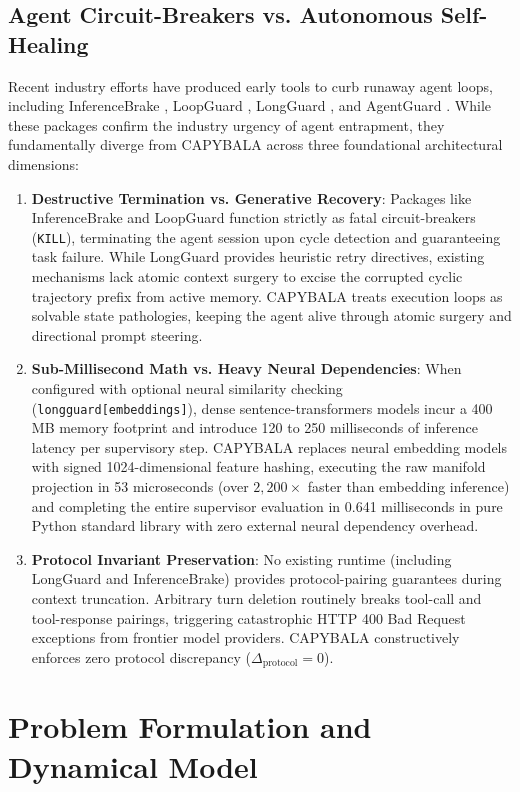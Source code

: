 \documentclass[journal]{IEEEtran}
\begin{document}
\subsection{Agent Circuit-Breakers vs. Autonomous Self-Healing}
Recent industry efforts have produced early tools to curb runaway agent loops, including InferenceBrake \cite{inferencebrake2024}, LoopGuard \cite{loopguard2024}, LongGuard \cite{longguard2024}, and AgentGuard \cite{agentguard2024}. While these packages confirm the industry urgency of agent entrapment, they fundamentally diverge from CAPYBALA across three foundational architectural dimensions:
\begin{enumerate}[leftmargin=12pt, topsep=2pt, itemsep=1pt]
    \item \textbf{Destructive Termination vs. Generative Recovery}: Packages like InferenceBrake and LoopGuard function strictly as fatal circuit-breakers (\texttt{KILL}), terminating the agent session upon cycle detection and guaranteeing task failure. While LongGuard provides heuristic retry directives, existing mechanisms lack atomic context surgery to excise the corrupted cyclic trajectory prefix from active memory. CAPYBALA treats execution loops as solvable state pathologies, keeping the agent alive through atomic surgery and directional prompt steering.
    \item \textbf{Sub-Millisecond Math vs. Heavy Neural Dependencies}: When configured with optional neural similarity checking (\texttt{longguard[embeddings]}), dense sentence-transformers models incur a 400 MB memory footprint and introduce 120 to 250 milliseconds of inference latency per supervisory step. CAPYBALA replaces neural embedding models with signed 1024-dimensional feature hashing, executing the raw manifold projection in 53 microseconds (over $2,200\times$ faster than embedding inference) and completing the entire supervisor evaluation in 0.641 milliseconds in pure Python standard library with zero external neural dependency overhead.
    \item \textbf{Protocol Invariant Preservation}: No existing runtime (including LongGuard and InferenceBrake) provides protocol-pairing guarantees during context truncation. Arbitrary turn deletion routinely breaks tool-call and tool-response pairings, triggering catastrophic HTTP 400 Bad Request exceptions from frontier model providers. CAPYBALA constructively enforces zero protocol discrepancy ($\Delta_{\text{protocol}} = 0$).
\end{enumerate}

\section{Problem Formulation and Dynamical Model}
\label{sec:dynamical_model}
\end{document}
